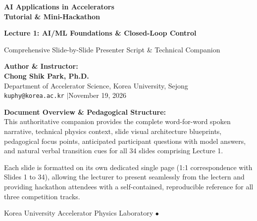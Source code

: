\documentclass[11pt,a4paper]{article}
\begin{document}
\begin{titlepage}
    \centering
    \vspace*{1.2cm}
    {\Huge\bfseries\color{navy}AI Applications in Accelerators\\[0.3em]Tutorial \& Mini-Hackathon\par}
    \vspace{0.8cm}
    {\LARGE\bfseries\color{primaryblue}Lecture 1: AI/ML Foundations \& Closed-Loop Control\par}
    \vspace{0.3cm}
    {\Large\color{accent}Comprehensive Slide-by-Slide Presenter Script \& Technical Companion\par}
    \vspace{1.2cm}

    \begin{tcolorbox}[colback=white,colframe=accent,width=0.88\textwidth,arc=4pt]
        \centering
        \textbf{Author \& Instructor:}\\[0.2em]
        {\large\bfseries Chong Shik Park, Ph.D.}\\[0.2em]
        Department of Accelerator Science, Korea University, Sejong\\[0.2em]
        \texttt{kuphy@korea.ac.kr} \enspace$|$\enspace November 19, 2026
    \end{tcolorbox}

    \vspace{1.2cm}
    \begin{minipage}{0.88\textwidth}
        \small\color{darkgray}
        \textbf{Document Overview \& Pedagogical Structure:}\\
        This authoritative companion provides the complete word-for-word spoken narrative, technical physics context, slide visual architecture blueprints, pedagogical focus points, anticipated participant questions with model answers, and natural verbal transition cues for all 34 slides comprising Lecture 1.
        \par\vspace{0.6em}
        Each slide is formatted on its own dedicated single page (1:1 correspondence with Slides 1 to 34), allowing the lecturer to present seamlessly from the lectern and providing hackathon attendees with a self-contained, reproducible reference for all three competition tracks.
    \end{minipage}
    \vfill
    {\footnotesize\color{darkgray}Korea University Accelerator Physics Laboratory \enspace$\bullet$}
\end{titlepage}
\end{document}

